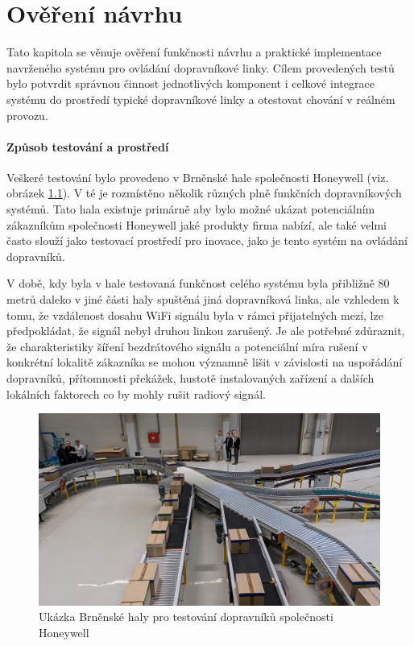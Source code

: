 \chapter{Ověření návrhu}
Tato kapitola se věnuje ověření funkčnosti návrhu a praktické implementace navrženého systému pro ovládání dopravníkové linky. Cílem provedených testů bylo potvrdit správnou činnost jednotlivých komponent i celkové integrace systému do prostředí typické dopravníkové linky a otestovat chování v reálném provozu.

\subsubsection{Způsob testování a prostředí}

Veškeré testování bylo provedeno v Brněnské hale společnosti Honeywell (viz. obrázek \ref{fig:BrnenskaHoneywellHala}). V té je rozmístěno několik různých plně funkčních dopravníkových systémů. Tato hala existuje primárně aby bylo možné ukázat potenciálním zákazníkům společnosti Honeywell jaké produkty firma nabízí, ale také velmi často slouží jako testovací prostředí pro inovace, jako je tento systém na ovládání dopravníků.

V době, kdy byla v hale testovaná funkčnost celého systému byla přibližně 80 metrů daleko v jiné části haly spuštěná jiná dopravníková linka, ale vzhledem k tomu, že vzdálenost dosahu WiFi signálu byla v rámci přijatelných mezí, lze předpokládat, že signál nebyl druhou linkou zarušený. Je ale potřebné zdůraznit, že charakteristiky šíření bezdrátového signálu a potenciální míra rušení v konkrétní lokalitě zákazníka se mohou významně lišit v závislosti na uspořádání dopravníků, přítomnosti překážek, hustotě instalovaných zařízení a dalších lokálních faktorech co by mohly rušit radiový signál.

\begin{figure}[hptb]
	\centering
	\includegraphics[width=1\linewidth]{images/BrnenskaHoneywellHala.png}
	\caption{Ukázka Brněnské haly pro testování dopravníků společnosti Honeywell \cite{HoneywellHala}}
	\label{fig:BrnenskaHoneywellHala}
\end{figure}

